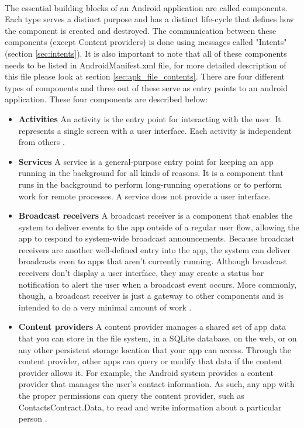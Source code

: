 \documentclass[../main.tex]{subfile}
\begin{document}
		\paragraph{} The essential building blocks of an Android application are called components. Each type serves a distinct purpose and has a distinct life-cycle that defines how the component is created and destroyed. The communication between these components (except Content providers) is done using messages called "Intents" (section \ref{sec:intents}). It is also important to note that all of these components needs to be listed in AndroidManifest.xml file, for more detailed description of this file please look at section \ref{sec:apk_file_contents}. There are four different types of components and three out of these serve as entry points to an android application. These four components are described below:
			\begin{itemize}
				\item \textbf{Activities} An activity is the entry point for interacting with the user. It represents a single screen with a user interface. Each activity is independent from others \cite{app_fundamentals}.
				\item \textbf{Services} A service is a general-purpose entry point for keeping an app running in the background for all kinds of reasons. It is a component that runs in the background to perform long-running operations or to perform work for remote processes. A service does not provide a user interface\cite{app_fundamentals}. 
				\item \textbf{Broadcast receivers} A broadcast receiver is a component that enables the system to deliver events to the app outside of a regular user flow, allowing the app to respond to system-wide broadcast announcements. Because broadcast receivers are another well-defined entry into the app, the system can deliver broadcasts even to apps that aren't currently running. Although broadcast receivers don't display a user interface, they may create a status bar notification to alert the user when a broadcast event occurs. More commonly, though, a broadcast receiver is just a gateway to other components and is intended to do a very minimal amount of work \cite{app_fundamentals}.
				\item \textbf{Content providers} A content provider manages a shared set of app data that you can store in the file system, in a SQLite database, on the web, or on any other persistent storage location that your app can access. Through the content provider, other apps can query or modify that data if the content provider allows it. For example, the Android system provides a content provider that manages the user's contact information. As such, any app with the proper permissions can query the content provider, such as ContactsContract.Data, to read and write information about a particular person \cite{app_fundamentals}.
			\end{itemize}
\end{document}

